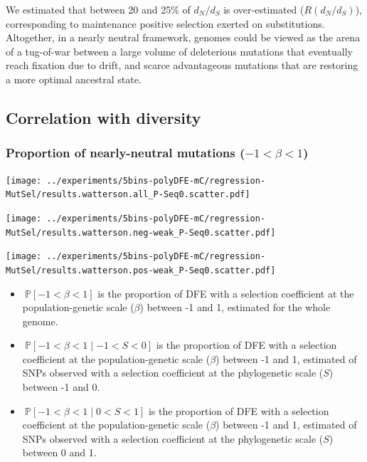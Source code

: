 \documentclass{article}
\newcommand{\proba}{\mathbb{P}}
\newcommand{\dn}{d_N}
\newcommand{\ds}{d_S}
\newcommand{\dnds}{\dn / \ds}
\newcommand{\Sphy}{S}
\newcommand{\divWeakDel}{-1 < \Sphy < 0}
\newcommand{\divWeakAdv}{0 < \Sphy < 1}
\newcommand{\given}{\mid}
\newcommand{\Spop}{\beta}
\newcommand{\polyNeutral}{-1 < \Spop < 1}
\begin{document}
    We estimated that between 20 and 25\% of $\dnds$ is over-estimated ($R(\dnds)$), corresponding to maintenance positive selection exerted on substitutions.
    Altogether, in a nearly neutral framework, genomes could be viewed as the arena of a tug-of-war between a large volume of deleterious mutations that eventually reach fixation due to drift, and scarce advantageous mutations that are restoring a more optimal ancestral state.

    \newpage

    \subsection{Correlation with diversity}

    \subsubsection{Proportion of nearly-neutral mutations ($\polyNeutral$)}\label{subsec:proportion-nearly-neutral-mutations}
    \begin{minipage}{0.32\linewidth}
        \texttt{[image: ../experiments/5bins-polyDFE-mC/regression-MutSel/results.watterson.all\_P-Seq0.scatter.pdf]}
    \end{minipage}
    \begin{minipage}{0.32\linewidth}
        \texttt{[image: ../experiments/5bins-polyDFE-mC/regression-MutSel/results.watterson.neg-weak\_P-Seq0.scatter.pdf]}
    \end{minipage}
    \begin{minipage}{0.32\linewidth}
        \texttt{[image: ../experiments/5bins-polyDFE-mC/regression-MutSel/results.watterson.pos-weak\_P-Seq0.scatter.pdf]}
    \end{minipage}
    \begin{itemize}
        \item $\ \proba [ \polyNeutral ]$ is the proportion of DFE with a selection coefficient at the population-genetic scale ($\Spop$) between -1 and 1, estimated for the whole genome.
        \item $\ \proba [ \polyNeutral \given \divWeakDel]$ is the proportion of DFE with a selection coefficient at the population-genetic scale ($\Spop$) between -1 and 1, estimated of SNPs observed with a selection coefficient at the phylogenetic scale ($\Sphy$) between -1 and 0.
        \item $\ \proba [ \polyNeutral \given \divWeakAdv ]$ is the proportion of DFE with a selection coefficient at the population-genetic scale ($\Spop$) between -1 and 1, estimated of SNPs observed with a selection coefficient at the phylogenetic scale ($\Sphy$) between 0 and 1.
    \end{itemize}
\end{document}
